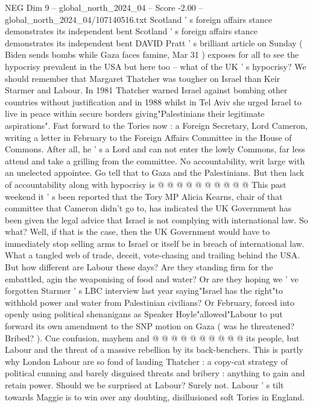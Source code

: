 \begin{textsample}{NEG Dim 9 – global\_north\_2024\_04 – Score -2.00 – global\_north\_2024\_04/107140516.txt}  \label{ex:f9_neg_225}
Scotland ' s foreign affairs stance demonstrates its independent bent Scotland ' s foreign affairs stance demonstrates its independent bent DAVID Pratt ' s brilliant article on Sunday ( Biden sends bombs while Gaza faces famine, Mar 31 ) exposes for all to see the hypocrisy prevalent in the USA but here too -- what of the UK ' s hypocrisy?
We should remember that Margaret Thatcher was tougher on Israel than Keir Starmer and Labour.
In 1981 Thatcher warned Israel against bombing other countries without justification and in 1988 whilst in Tel Aviv she urged Israel to live in peace within secure borders giving"Palestinians their legitimate aspirations".
Fast forward to the Tories now : a Foreign Secretary, Lord Cameron, writing a letter in February to the Foreign Affairs Committee in the House of Commons.
After all, he ' s a Lord and can not enter the lowly Commons, far less attend and take a grilling from the committee.
No accountability, writ large with an unelected appointee.
Go tell that to Gaza and the Palestinians.
But then lack of accountability along with hypocrisy is @ @ @ @ @ @ @ @ @ @ This past weekend it ' s been reported that the Tory MP Alicia Kearns, chair of that committee that Cameron didn't go to, has indicated the UK Government has been given the legal advice that Israel is not complying with international law.
So what?
Well, if that is the case, then the UK Government would have to immediately stop selling arms to Israel or itself be in breach of international law.
What a tangled web of trade, deceit, vote-chasing and trailing behind the USA.
But how different are Labour these days?
Are they standing firm for the embattled, agin the weaponising of food and water?
Or are they hoping we ' ve forgotten Starmer ' s LBC interview last year saying"Israel has the right"to withhold power and water from Palestinian civilians?
Or February, forced into openly using political shenanigans as Speaker Hoyle"allowed"Labour to put forward its own amendment to the SNP motion on Gaza ( was he threatened?
Bribed? ).
Cue confusion, mayhem and @ @ @ @ @ @ @ @ @ @ its people, but Labour and the threat of a massive rebellion by its back-benchers.
This is partly why London Labour are so fond of lauding Thatcher : a copy-cat strategy of political cunning and barely disguised threats and bribery : anything to gain and retain power.
Should we be surprised at Labour?
Surely not.
Labour ' s tilt towards Maggie is to win over any doubting, disillusioned soft Tories in England.

\end{textsample}
